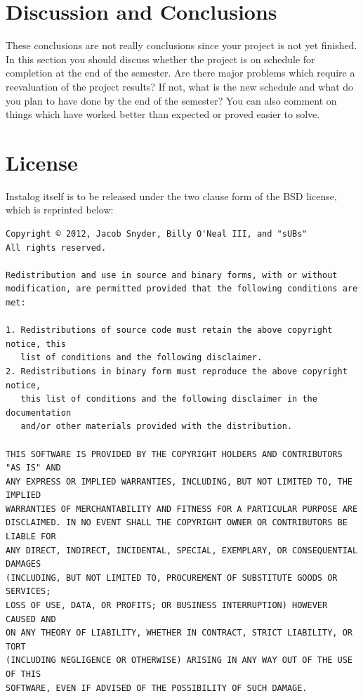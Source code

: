 \documentclass[letterpaper,12pt]{article}
\begin{document}
\newpage



\section{Discussion and Conclusions} \label{discussion}
These conclusions are not really conclusions since your project is not yet
finished. In this section you should discuss whether the project is on schedule
for completion at the end of the semester. Are there major problems which
require a reevaluation of the project results?  If not, what is the new schedule
and what do you plan to have done by the end of the semester?  You can also
comment on things which have worked better than expected or proved easier to
solve.

\newpage



\section{License} \label{license}
Instalog itself is to be released under the two clause form of the BSD license,
which is reprinted below:

\begin{verbatim}
Copyright © 2012, Jacob Snyder, Billy O'Neal III, and "sUBs"
All rights reserved.

Redistribution and use in source and binary forms, with or without
modification, are permitted provided that the following conditions are met: 

1. Redistributions of source code must retain the above copyright notice, this
   list of conditions and the following disclaimer. 
2. Redistributions in binary form must reproduce the above copyright notice,
   this list of conditions and the following disclaimer in the documentation
   and/or other materials provided with the distribution. 

THIS SOFTWARE IS PROVIDED BY THE COPYRIGHT HOLDERS AND CONTRIBUTORS "AS IS" AND
ANY EXPRESS OR IMPLIED WARRANTIES, INCLUDING, BUT NOT LIMITED TO, THE IMPLIED
WARRANTIES OF MERCHANTABILITY AND FITNESS FOR A PARTICULAR PURPOSE ARE
DISCLAIMED. IN NO EVENT SHALL THE COPYRIGHT OWNER OR CONTRIBUTORS BE LIABLE FOR
ANY DIRECT, INDIRECT, INCIDENTAL, SPECIAL, EXEMPLARY, OR CONSEQUENTIAL DAMAGES
(INCLUDING, BUT NOT LIMITED TO, PROCUREMENT OF SUBSTITUTE GOODS OR SERVICES;
LOSS OF USE, DATA, OR PROFITS; OR BUSINESS INTERRUPTION) HOWEVER CAUSED AND
ON ANY THEORY OF LIABILITY, WHETHER IN CONTRACT, STRICT LIABILITY, OR TORT
(INCLUDING NEGLIGENCE OR OTHERWISE) ARISING IN ANY WAY OUT OF THE USE OF THIS
SOFTWARE, EVEN IF ADVISED OF THE POSSIBILITY OF SUCH DAMAGE.
\end{verbatim}
\end{document}
